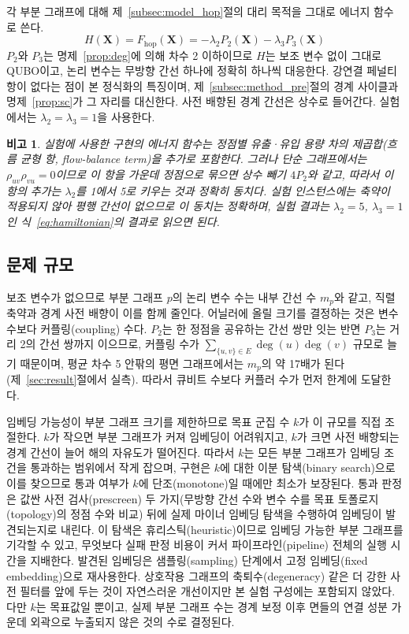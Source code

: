 \documentclass[twocolumn,a4paper]{article}
\newtheorem{remark}{비고}
\begin{document}
각 부분 그래프에 대해 제~\ref{subsec:model_hop}절의 대리 목적을 그대로 에너지 함수로 쓴다.
\begin{equation}
    H(\mathbf{X})=F_{\mathrm{hop}}(\mathbf{X})=-\lambda_2P_2(\mathbf{X})-\lambda_3P_3(\mathbf{X})
\label{eq:hamiltonian}
\end{equation}
\(P_2\)와 \(P_3\)는 명제~\ref{prop:deg}에 의해 차수 2 이하이므로 \(H\)는 보조 변수 없이 그대로 QUBO이고, 논리 변수는 무방향 간선 하나에 정확히 하나씩 대응한다. 강연결 페널티 항이 없다는 점이 본 정식화의 특징이며, 제~\ref{subsec:method_pre}절의 경계 사이클과 명제~\ref{prop:sc}가 그 자리를 대신한다. 사전 배향된 경계 간선은 상수로 들어간다. 실험에서는 \(\lambda_2=\lambda_3=1\)을 사용한다.

\begin{remark} \label{rmk:flow}
실험에 사용한 구현의 에너지 함수는 정점별 유출·유입 용량 차의 제곱합(흐름 균형 항, flow-balance term)을 추가로 포함한다. 그러나 단순 그래프에서는 \(\rho_{uv}\rho_{vu}=0\)이므로 이 항을 가운데 정점으로 묶으면 상수 빼기 \(4P_2\)와 같고, 따라서 이 항의 추가는 \(\lambda_2\)를 1에서 5로 키우는 것과 정확히 동치다. 실험 인스턴스에는 축약이 적용되지 않아 평행 간선이 없으므로 이 동치는 정확하며, 실험 결과는 \(\lambda_2=5\), \(\lambda_3=1\)인 식~\eqref{eq:hamiltonian}의 결과로 읽으면 된다.
\end{remark}

\subsection{문제 규모} \label{subsec:method_partition}

보조 변수가 없으므로 부분 그래프 \(p\)의 논리 변수 수는 내부 간선 수 \(m_p\)와 같고, 직렬 축약과 경계 사전 배향이 이를 함께 줄인다. 어닐러에 올릴 크기를 결정하는 것은 변수 수보다 커플링(coupling) 수다. \(P_2\)는 한 정점을 공유하는 간선 쌍만 잇는 반면 \(P_3\)는 거리 2의 간선 쌍까지 이으므로, 커플링 수가 \(\sum_{\{u,v\}\in E}\deg(u)\deg(v)\) 규모로 늘기 때문이며, 평균 차수 5 안팎의 평면 그래프에서는 \(m_p\)의 약 17배가 된다(제~\ref{sec:result}절에서 실측). 따라서 큐비트 수보다 커플러 수가 먼저 한계에 도달한다.

임베딩 가능성이 부분 그래프 크기를 제한하므로 목표 군집 수 \(k\)가 이 규모를 직접 조절한다. \(k\)가 작으면 부분 그래프가 커져 임베딩이 어려워지고, \(k\)가 크면 사전 배향되는 경계 간선이 늘어 해의 자유도가 떨어진다. 따라서 \(k\)는 모든 부분 그래프가 임베딩 조건을 통과하는 범위에서 작게 잡으며, 구현은 \(k\)에 대한 이분 탐색(binary search)으로 이를 찾으므로 통과 여부가 \(k\)에 단조(monotone)일 때에만 최소가 보장된다. 통과 판정은 값싼 사전 검사(prescreen) 두 가지(무방향 간선 수와 변수 수를 목표 토폴로지(topology)의 정점 수와 비교) 뒤에 실제 마이너 임베딩 탐색을 수행하여 임베딩이 발견되는지로 내린다. 이 탐색은 휴리스틱(heuristic)이므로 임베딩 가능한 부분 그래프를 기각할 수 있고, 무엇보다 실패 판정 비용이 커서 파이프라인(pipeline) 전체의 실행 시간을 지배한다. 발견된 임베딩은 샘플링(sampling) 단계에서 고정 임베딩(fixed embedding)으로 재사용한다. 상호작용 그래프의 축퇴수(degeneracy) 같은 더 강한 사전 필터를 앞에 두는 것이 자연스러운 개선이지만 본 실험 구성에는 포함되지 않았다. 다만 \(k\)는 목표값일 뿐이고, 실제 부분 그래프 수는 경계 보정 이후 면들의 연결 성분 가운데 외곽으로 누출되지 않은 것의 수로 결정된다.
\end{document}
